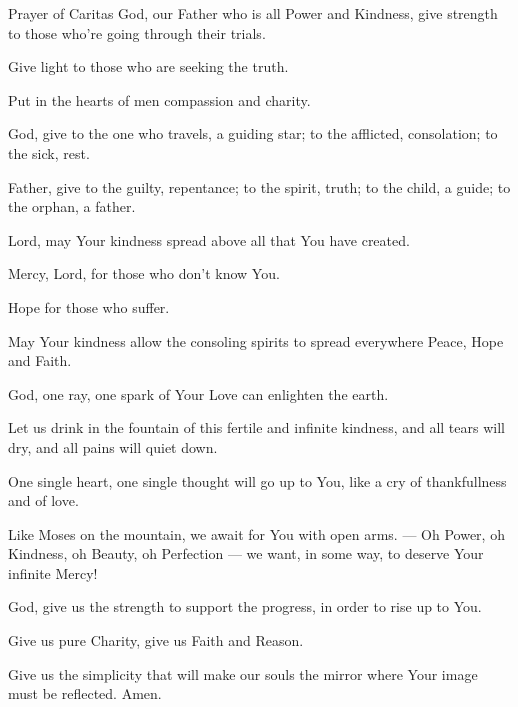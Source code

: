   \begin{passage}[EN]{Prayer of Caritas}
    God, our Father who is all Power and Kindness,
    give strength to those who're going through
    their trials.
    \par
    Give light to those who are seeking the truth.
    \par
    Put in the hearts of men compassion and charity.
    \par
    God, give to the one who travels, a guiding star;
    to the afflicted, consolation; to the sick, rest.
    \par
    Father, give to the guilty, repentance; to the
    spirit, truth; to the child, a guide; to the orphan,
    a father.
    \par
    Lord, may Your kindness spread above all that You
    have created.
    \par
    Mercy, Lord, for those who don't know You.
    \par
    Hope for those who suffer.
    \par
    May Your kindness allow the consoling spirits to
    spread everywhere Peace, Hope and Faith.
    \par
    God, one ray, one spark of Your Love can enlighten
    the earth.
    \par
    Let us drink in the fountain of this fertile and
    infinite kindness, and all tears will dry, and all pains
    will quiet down.
    \par
    One single heart, one single thought will go up to
    You, like a cry of thankfullness and of love.
    \par
    Like Moses on the mountain, we await for You with
    open arms. --- Oh Power, oh Kindness, oh Beauty, oh Perfection --- we want, in some way, to deserve Your infinite Mercy!
    \par
    God, give us the strength to support the progress,
    in order to rise up to You.
    \par
    Give us pure Charity, give us Faith and Reason.
    \par
    Give us the simplicity that will make our souls the
    mirror where Your image must be reflected. Amen.
  \end{passage}
